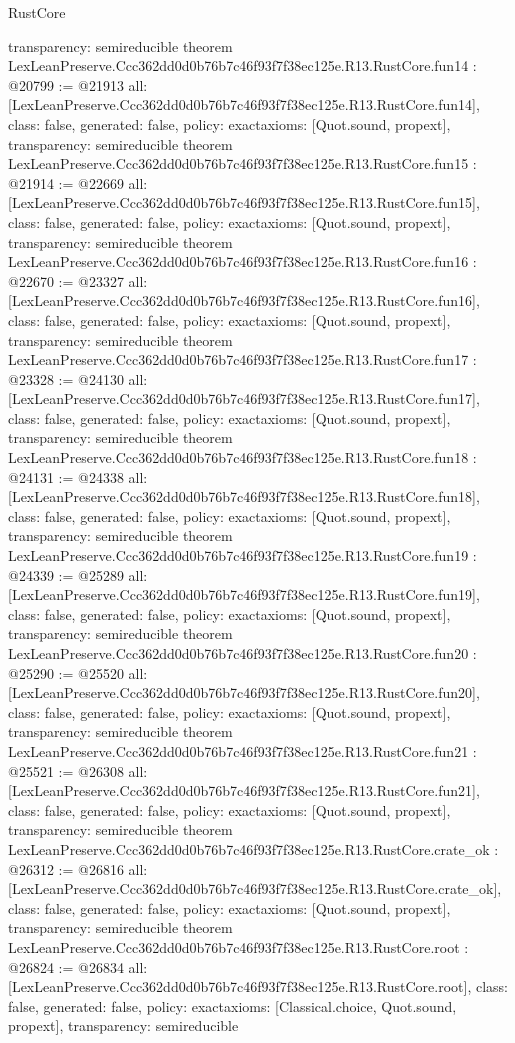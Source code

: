 \begin{lexlean}{RustCore}
\begin{coremodule}
{  transparency: semireducible
}
theorem LexLeanPreserve.Ccc362dd0d0b76b7c46f93f7f38ec125e.R13.RustCore.fun14 : @20799 := @21913 {
  all: [LexLeanPreserve.Ccc362dd0d0b76b7c46f93f7f38ec125e.R13.RustCore.fun14],
  class: false,
  generated: false,
  policy: exact{axioms: [Quot.sound, propext]},
  transparency: semireducible
}
theorem LexLeanPreserve.Ccc362dd0d0b76b7c46f93f7f38ec125e.R13.RustCore.fun15 : @21914 := @22669 {
  all: [LexLeanPreserve.Ccc362dd0d0b76b7c46f93f7f38ec125e.R13.RustCore.fun15],
  class: false,
  generated: false,
  policy: exact{axioms: [Quot.sound, propext]},
  transparency: semireducible
}
theorem LexLeanPreserve.Ccc362dd0d0b76b7c46f93f7f38ec125e.R13.RustCore.fun16 : @22670 := @23327 {
  all: [LexLeanPreserve.Ccc362dd0d0b76b7c46f93f7f38ec125e.R13.RustCore.fun16],
  class: false,
  generated: false,
  policy: exact{axioms: [Quot.sound, propext]},
  transparency: semireducible
}
theorem LexLeanPreserve.Ccc362dd0d0b76b7c46f93f7f38ec125e.R13.RustCore.fun17 : @23328 := @24130 {
  all: [LexLeanPreserve.Ccc362dd0d0b76b7c46f93f7f38ec125e.R13.RustCore.fun17],
  class: false,
  generated: false,
  policy: exact{axioms: [Quot.sound, propext]},
  transparency: semireducible
}
theorem LexLeanPreserve.Ccc362dd0d0b76b7c46f93f7f38ec125e.R13.RustCore.fun18 : @24131 := @24338 {
  all: [LexLeanPreserve.Ccc362dd0d0b76b7c46f93f7f38ec125e.R13.RustCore.fun18],
  class: false,
  generated: false,
  policy: exact{axioms: [Quot.sound, propext]},
  transparency: semireducible
}
theorem LexLeanPreserve.Ccc362dd0d0b76b7c46f93f7f38ec125e.R13.RustCore.fun19 : @24339 := @25289 {
  all: [LexLeanPreserve.Ccc362dd0d0b76b7c46f93f7f38ec125e.R13.RustCore.fun19],
  class: false,
  generated: false,
  policy: exact{axioms: [Quot.sound, propext]},
  transparency: semireducible
}
theorem LexLeanPreserve.Ccc362dd0d0b76b7c46f93f7f38ec125e.R13.RustCore.fun20 : @25290 := @25520 {
  all: [LexLeanPreserve.Ccc362dd0d0b76b7c46f93f7f38ec125e.R13.RustCore.fun20],
  class: false,
  generated: false,
  policy: exact{axioms: [Quot.sound, propext]},
  transparency: semireducible
}
theorem LexLeanPreserve.Ccc362dd0d0b76b7c46f93f7f38ec125e.R13.RustCore.fun21 : @25521 := @26308 {
  all: [LexLeanPreserve.Ccc362dd0d0b76b7c46f93f7f38ec125e.R13.RustCore.fun21],
  class: false,
  generated: false,
  policy: exact{axioms: [Quot.sound, propext]},
  transparency: semireducible
}
theorem LexLeanPreserve.Ccc362dd0d0b76b7c46f93f7f38ec125e.R13.RustCore.crate_ok : @26312 := @26816 {
  all: [LexLeanPreserve.Ccc362dd0d0b76b7c46f93f7f38ec125e.R13.RustCore.crate_ok],
  class: false,
  generated: false,
  policy: exact{axioms: [Quot.sound, propext]},
  transparency: semireducible
}
theorem LexLeanPreserve.Ccc362dd0d0b76b7c46f93f7f38ec125e.R13.RustCore.root : @26824 := @26834 {
  all: [LexLeanPreserve.Ccc362dd0d0b76b7c46f93f7f38ec125e.R13.RustCore.root],
  class: false,
  generated: false,
  policy: exact{axioms: [Classical.choice, Quot.sound, propext]},
  transparency: semireducible
}


\end{coremodule}
\end{lexlean}
